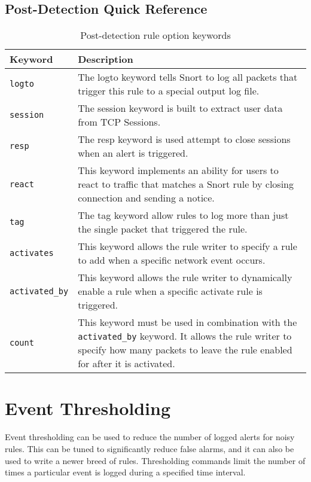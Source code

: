 \documentclass[english]{report}
\begin{document}
\subsection{Post-Detection Quick Reference}
\begin{center}
\begin{longtable}{| p{1in} | p{5in} |}
\caption{Post-detection rule option keywords} \\
\hline
Keyword & Description \\
\hline
\texttt{logto} & The logto keyword tells Snort to log all packets that trigger this
rule to a special output log file. \\
\hline
\texttt{session} & The session keyword is built to extract user data from TCP
Sessions. \\
\hline
\texttt{resp} & The resp keyword is used attempt to close sessions when an alert is
triggered. \\
\hline
\texttt{react} & This keyword implements an ability for users to react to traffic
that matches a Snort rule by closing connection and sending a notice. \\
\hline
\texttt{tag} & The tag keyword allow rules to log more than just the single packet
that triggered the rule. \\
\hline
\texttt{activates} & This keyword  allows the rule writer to specify a rule to add when
a specific network event occurs. \\
\hline
\texttt{activated\_by} & This keyword allows the rule writer to dynamically enable a rule when
a specific activate rule is triggered. \\
\hline
\texttt{count} & This keyword must be used in combination with the \texttt{activated\_by} keyword.
It allows the rule writer to specify how many packets to leave the rule 
enabled for after it is activated. \\
\hline
\end{longtable}
\end{center}


\section{Event Thresholding\label{Event Thresholding}}

Event thresholding can be used to reduce the number of logged alerts for noisy
rules.  This can be tuned to significantly reduce false alarms, and it can also
be used to write a newer breed of rules. Thresholding commands limit the number
of times a particular event is logged during a specified time interval. 
\end{document}
